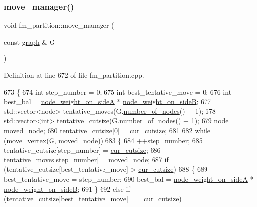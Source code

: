 \subsubsection{\texorpdfstring{move\+\_\+manager()}{move\_manager()}}
{\footnotesize\ttfamily void fm\+\_\+partition\+::move\+\_\+manager (\begin{DoxyParamCaption}\item[{const \mbox{\hyperlink{classgraph}{graph}} \&}]{G }\end{DoxyParamCaption})\hspace{0.3cm}{\ttfamily [protected]}}



Definition at line 672 of file fm\+\_\+partition.\+cpp.


\begin{DoxyCode}
673 \{
674     \textcolor{keywordtype}{int} step\_number = 0;
675     \textcolor{keywordtype}{int} best\_tentative\_move = 0;
676     \textcolor{keywordtype}{int} best\_bal = \mbox{\hyperlink{classfm__partition_a8a50d15b399c9ed35d6987c8fb68aa2b}{node\_weight\_on\_sideA}} * 
      \mbox{\hyperlink{classfm__partition_a6dc967e385b31096a85f17c51f1f0824}{node\_weight\_on\_sideB}};
677     std::vector<node> tentative\_moves(G.\mbox{\hyperlink{classgraph_a42c78e0a9f115655e3ff0efe35ebfc4e}{number\_of\_nodes}}() + 1);
678     std::vector<int> tentative\_cutsize(G.\mbox{\hyperlink{classgraph_a42c78e0a9f115655e3ff0efe35ebfc4e}{number\_of\_nodes}}() + 1);
679     \mbox{\hyperlink{classnode}{node}} moved\_node;
680     tentative\_cutsize[0] = \mbox{\hyperlink{classfm__partition_abc8f24c354d2a15f8ec8ef9a46252c93}{cur\_cutsize}};
681 
682     \textcolor{keywordflow}{while} (\mbox{\hyperlink{classfm__partition_ac1167c6595a9f582ae98c9f555029d9b}{move\_vertex}}(G, moved\_node))
683     \{
684     ++step\_number;
685     tentative\_cutsize[step\_number] = \mbox{\hyperlink{classfm__partition_abc8f24c354d2a15f8ec8ef9a46252c93}{cur\_cutsize}};
686     tentative\_moves[step\_number] = moved\_node;
687     \textcolor{keywordflow}{if} (tentative\_cutsize[best\_tentative\_move] > \mbox{\hyperlink{classfm__partition_abc8f24c354d2a15f8ec8ef9a46252c93}{cur\_cutsize}})
688     \{
689         best\_tentative\_move = step\_number;
690         best\_bal = \mbox{\hyperlink{classfm__partition_a8a50d15b399c9ed35d6987c8fb68aa2b}{node\_weight\_on\_sideA}} * 
      \mbox{\hyperlink{classfm__partition_a6dc967e385b31096a85f17c51f1f0824}{node\_weight\_on\_sideB}};
691     \}
692     \textcolor{keywordflow}{else} \textcolor{keywordflow}{if} (tentative\_cutsize[best\_tentative\_move] == \mbox{\hyperlink{classfm__partition_abc8f24c354d2a15f8ec8ef9a46252c93}{cur\_cutsize}})

\end{DoxyCode}
